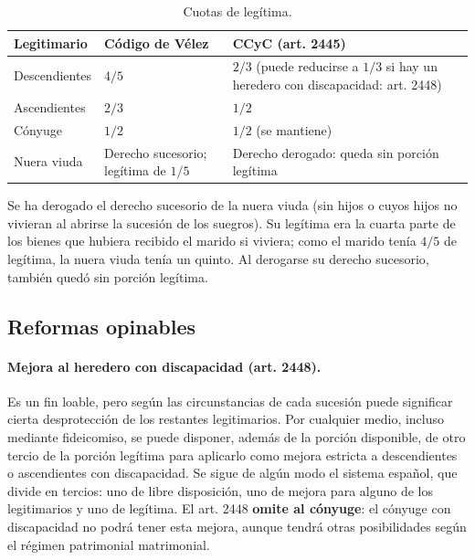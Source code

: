 \documentclass[12pt,oneside]{book}
\begin{document}
\begin{table}[H]
\centering
\small
\begin{tabularx}{\textwidth}{
    >{\raggedright\arraybackslash}p{3cm}
    >{\raggedright\arraybackslash}p{4.3cm}
    >{\raggedright\arraybackslash}X
}
\toprule
\textbf{Legitimario} & \textbf{Código de Vélez} & \textbf{CCyC (art. 2445)} \\
\midrule
Descendientes & $4/5$ & $2/3$ (puede reducirse a $1/3$ si hay un heredero con discapacidad: art. 2448) \\
\addlinespace
Ascendientes & $2/3$ & $1/2$ \\
\addlinespace
Cónyuge & $1/2$ & $1/2$ (se mantiene) \\
\addlinespace
Nuera viuda & Derecho sucesorio; legítima de $1/5$ & Derecho derogado: queda sin porción legítima \\
\bottomrule
\end{tabularx}
\caption*{Cuotas de legítima.}
\end{table}

Se ha derogado el derecho sucesorio de la nuera viuda (sin hijos o cuyos hijos no vivieran al abrirse la sucesión de los suegros). Su legítima era la cuarta parte de los bienes que hubiera recibido el marido si viviera; como el marido tenía $4/5$ de legítima, la nuera viuda tenía un quinto. Al derogarse su derecho sucesorio, también quedó sin porción legítima.

\subsection{Reformas opinables}

\paragraph{Mejora al heredero con discapacidad (art. 2448).} Es un fin loable, pero según las circunstancias de cada sucesión puede significar cierta desprotección de los restantes legitimarios. Por cualquier medio, incluso mediante fideicomiso, se puede disponer, además de la porción disponible, de otro tercio de la porción legítima para aplicarlo como mejora estricta a descendientes o ascendientes con discapacidad. Se sigue de algún modo el sistema español, que divide en tercios: uno de libre disposición, uno de mejora para alguno de los legitimarios y uno de legítima. El art. 2448 \textbf{omite al cónyuge}: el cónyuge con discapacidad no podrá tener esta mejora, aunque tendrá otras posibilidades según el régimen patrimonial matrimonial.
\end{document}
